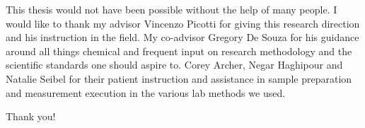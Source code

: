 \documentclass[bscthesis]{../eapsthesis}
\begin{document}
\tableofcontents 

\mainmatter
\fancyhead{}
\fancyhead[LE, RO]{\thepage}
\fancyhead[RE]{\leftmark}
\fancyhead[LO]{\rightmark}









\backmatter

\printbibliography

\cleardoublepage

\begin{acknowledgements}
This thesis would not have been possible without the help of many people.
I would like to thank my advisor Vincenzo Picotti for giving this research
direction and his instruction in the field. 
My co-advisor Gregory De Souza for his guidance around all things chemical and frequent input
on research methodology and the scientific standards one should aspire to.
Corey Archer, Negar Haghipour and Natalie Seibel for their patient instruction and assistance in sample preparation
and measurement execution in the various lab methods we used.

Thank you!
\end{acknowledgements}
\end{document}

